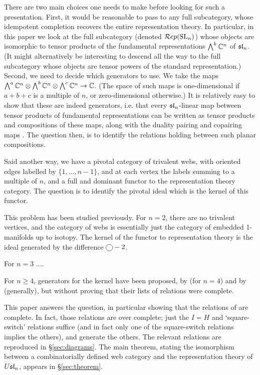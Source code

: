 \documentclass[10pt,leqno]{article}
\begin{document}
There are two main choices one needs to make before looking for such a presentation. First, it would be reasonable to pass to any full subcategory, whose idempotent completion recovers the entire representation theory. In particular, in this paper we look at the full subcategory (denoted $\Rep(\SL_n)$) whose objects are isomorphic to tensor products of the fundamental representations $\Alt^k \mathbb C^n$ of $\sl_n$. (It might alternatively be interesting to descend all the way to the full subcategory whose objects are tensor powers of the standard representation.) Second, we need to decide which generators to use. We take the maps $\Alt^a \mathbb{C}^n \tensor \Alt^b \mathbb{C}^n \tensor \Alt^c \mathbb{C}^n \to \mathbb{C}$. (The space of such maps is one-dimensional if $a+b+c$ is a multiple of $n$, or zero-dimensional otherwise.) It is relatively easy to show that these are indeed generators, i.e. that every $\sl_n$-linear map between tensor products of fundamental representations can be written as tensor products and compositions of these maps, along with the duality pairing and copairing maps \cite[Proposition 3.5.8]{0704.1503}. The question then, is to identify the relations holding between such planar compositions.

Said another way, we have a pivotal category of trivalent webs, with oriented edges labelled by $\{1, \ldots, n-1\}$, and at each vertex the labels summing to a multiple of $n$, and a full and dominant functor to the representation theory category. The question is to identify the pivotal ideal which is the kernel of this functor.

This problem has been studied previously. For $n=2$, there are no trivalent vertices, and the category of webs is essentially just the category of embedded 1-manifolds up to isotopy. The kernel of the functor to representation theory is the ideal generated by the difference $\tikz[baseline=-2pt]{\node[draw,circle] {};} - 2$. 

For $n=3$ .... 

For $n \geq 4$, generators for the kernel have been proposed, by \cite{math.QA/0310143} (for $n=4$) and by \cite{0704.1503} (generally), but without proving that their lists of relations were complete.

This paper answers the question, in particular showing that the relations of \cite{0704.1503} are complete. In fact, those relations are over complete; just the $I=H$ and `square-switch' relations suffice (and in fact only one of the square-switch relations implies the others), and generate the others. The relevant relations are reproduced in \S\ref{sec:diagrams}.
The main theorem, stating the isomorphism between a combinatorially defined web category and the representation theory of $\Usl{n}$, appears in \S \ref{sec:theorem}.
\end{document}

